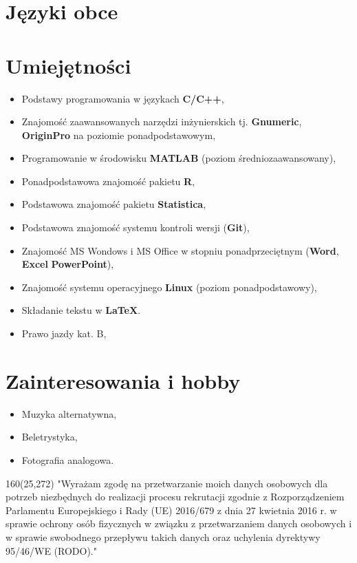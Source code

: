 \documentclass[10pt, a4paper, sans]{moderncv}   %
\begin{document}
\newpage

\section{Języki obce}


\section{Umiejętności}
{\begin{itemize}
	\item Podstawy programowania w językach \textbf{C/C++}, 
	\item Znajomość zaawansowanych narzędzi inżynierskich tj. \textbf{Gnumeric}, \textbf{OriginPro} na poziomie ponadpodstawowym,
	\item Programowanie w środowisku \textbf{MATLAB} (poziom średniozaawansowany),
    \item Ponadpodstawowa znajomość pakietu \textbf{R},
    \item Podstawowa znajomość pakietu \textbf{Statistica},
    \item Podstawowa znajomość systemu kontroli wersji (\textbf{Git}),
	\item Znajomość MS Wondows i MS Office w stopniu ponadprzeciętnym (\textbf{Word}, \textbf{Excel} \textbf{PowerPoint}),
	\item Znajomość systemu operacyjnego \textbf{Linux} (poziom ponadpodstawowy),
	\item Składanie tekstu w \textbf{\LaTeX}.
	\item Prawo jazdy kat. B,
\end{itemize}}



\section{Zainteresowania i hobby}
{\begin{itemize}
\item Muzyka alternatywna,
\item Beletrystyka,
\item Fotografia analogowa.

\end{itemize}}

\begin{textblock}{160}(25,272)
\noindent "Wyrażam zgodę na przetwarzanie moich danych osobowych dla potrzeb niezbędnych do realizacji procesu rekrutacji zgodnie z Rozporządzeniem Parlamentu Europejskiego i Rady (UE) 2016/679 z dnia 27 kwietnia 2016 r. w sprawie ochrony osób fizycznych w związku z przetwarzaniem danych osobowych i w sprawie swobodnego przepływu takich danych oraz uchylenia dyrektywy 95/46/WE (RODO)."

\end{textblock}
\end{document}
